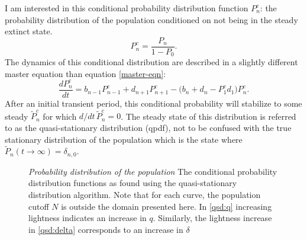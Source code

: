 I am interested in this conditional probability distribution function $P_n^c$: the probability distribution of the population conditioned on not being in the steady extinct state. 
\begin{equation*}
 P_n^c = \frac{P_n}{1-P_0}.
\end{equation*}
The dynamics of this conditional distribution are described in a slightly different master equation than equation \ref{master-eqn}:
\begin{equation}
\frac{dP_n^c}{dt} =  b_{n-1}P_{n-1}^c + d_{n+1}P_{n+1}^c - \big(b_n + d_n - P_1^c d_1 \big) P_n^c. 
\label{masters2}
\end{equation}
After an initial transient period, this conditional probability will stabilize to some steady $\tilde{P}^c_n$ for which $d/dt\,\tilde{P}_n^c=0$. 
The steady state of this distribution is referred to as the quasi-stationary distribution (qpdf), not to be confused with the true stationary distribution of the population which is the state where $\tilde{P}_n(t\rightarrow\infty)=\delta_{n,0}$. 


\begin{figure}[ht!]
	\centering
	\hfill
	\caption{\emph{Probability distribution of the population} The conditional probability distribution functions as found using the quasi-stationary distribution algorithm. Note that for each curve, the population cutoff $N$ is outside the domain presented here. In \ref{qsd:q} increasing lightness indicates an increase in $q$. Similarly, the lightness increase in \ref{qsd:delta} corresponds to an increase in $\delta$}
	\label{qsd}
\end{figure}

